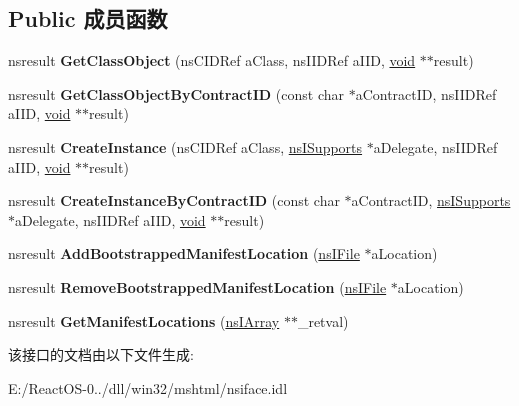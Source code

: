 \subsection*{Public 成员函数}
\begin{DoxyCompactItemize}
\item 
\mbox{\label{interfacens_i_component_manager_aa9b0cc2c88d440e447625be7e6105dbb}} 
nsresult {\bfseries Get\+Class\+Object} (ns\+C\+I\+D\+Ref a\+Class, ns\+I\+I\+D\+Ref a\+I\+ID, \hyperlink{interfacevoid}{void} $\ast$$\ast$result)
\item 
\mbox{\label{interfacens_i_component_manager_a46898bdbd164f10c58aeb99f86b7f0d7}} 
nsresult {\bfseries Get\+Class\+Object\+By\+Contract\+ID} (const char $\ast$a\+Contract\+ID, ns\+I\+I\+D\+Ref a\+I\+ID, \hyperlink{interfacevoid}{void} $\ast$$\ast$result)
\item 
\mbox{\label{interfacens_i_component_manager_af506289503b121ddef9a40ffed3bb42f}} 
nsresult {\bfseries Create\+Instance} (ns\+C\+I\+D\+Ref a\+Class, \hyperlink{interfacens_i_supports}{ns\+I\+Supports} $\ast$a\+Delegate, ns\+I\+I\+D\+Ref a\+I\+ID, \hyperlink{interfacevoid}{void} $\ast$$\ast$result)
\item 
\mbox{\label{interfacens_i_component_manager_ade30357d02458a14c5ec7af0400cba9d}} 
nsresult {\bfseries Create\+Instance\+By\+Contract\+ID} (const char $\ast$a\+Contract\+ID, \hyperlink{interfacens_i_supports}{ns\+I\+Supports} $\ast$a\+Delegate, ns\+I\+I\+D\+Ref a\+I\+ID, \hyperlink{interfacevoid}{void} $\ast$$\ast$result)
\item 
\mbox{\label{interfacens_i_component_manager_ae216ad52051fc4403fc48df2c67deb43}} 
nsresult {\bfseries Add\+Bootstrapped\+Manifest\+Location} (\hyperlink{interfacens_i_file}{ns\+I\+File} $\ast$a\+Location)
\item 
\mbox{\label{interfacens_i_component_manager_ab1c86c1ca882faf56b6779109d549ef9}} 
nsresult {\bfseries Remove\+Bootstrapped\+Manifest\+Location} (\hyperlink{interfacens_i_file}{ns\+I\+File} $\ast$a\+Location)
\item 
\mbox{\label{interfacens_i_component_manager_a6390ff7fbeabe2ce463fcbbc59f25c17}} 
nsresult {\bfseries Get\+Manifest\+Locations} (\hyperlink{interfacens_i_supports}{ns\+I\+Array} $\ast$$\ast$\+\_\+retval)
\end{DoxyCompactItemize}


该接口的文档由以下文件生成\+:\begin{DoxyCompactItemize}
\item 
E\+:/\+React\+O\+S-\/0../dll/win32/mshtml/nsiface.\+idl\end{DoxyCompactItemize}
